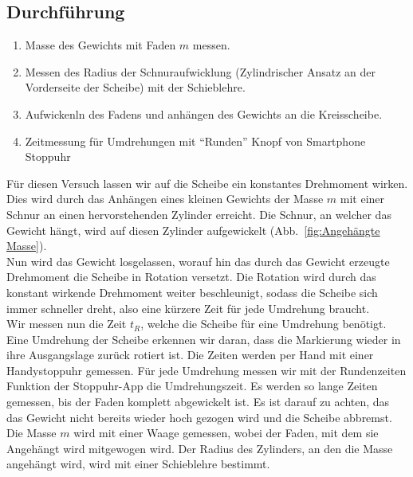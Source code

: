 \documentclass{article}
\begin{document}
		\subsection{Durchführung}
			\begin{enumerate}
				\item Masse des Gewichts mit Faden \(m\) messen.
				\item Messen des Radius der Schnuraufwicklung (Zylindrischer Ansatz an der Vorderseite der Scheibe) mit der Schieblehre.
				\item Aufwickenln des Fadens und anhängen des Gewichts an die Kreisscheibe.
				\item Zeitmessung für Umdrehungen mit \enquote{Runden} Knopf von Smartphone Stoppuhr
			\end{enumerate} %
			Für diesen Versuch lassen wir auf die Scheibe ein konstantes Drehmoment wirken.
			Dies wird durch das Anhängen eines kleinen Gewichts der Masse \(m\) mit einer Schnur an einen hervorstehenden Zylinder erreicht.
			Die Schnur, an welcher das Gewicht hängt, wird auf diesen Zylinder aufgewickelt (Abb.~\ref{fig:Angehängte Masse}). \\
			Nun wird das Gewicht losgelassen, worauf hin das durch das Gewicht erzeugte Drehmoment die Scheibe in Rotation versetzt.
			Die Rotation wird durch das konstant wirkende Drehmoment weiter beschleunigt, sodass die Scheibe sich immer schneller dreht, also eine kürzere Zeit für jede Umdrehung braucht. \\
			Wir messen nun die Zeit \(t_R\), welche die Scheibe für eine Umdrehung benötigt.
			Eine Umdrehung der Scheibe erkennen wir daran, dass die Markierung wieder in ihre Ausgangslage zurück rotiert ist.
			Die Zeiten werden per Hand mit einer Handystoppuhr gemessen. Für jede Umdrehung messen wir mit der Rundenzeiten Funktion der Stoppuhr-App die Umdrehungszeit.
			Es werden so lange Zeiten gemessen, bis der Faden komplett abgewickelt ist. Es ist darauf zu achten, das das Gewicht nicht bereits wieder hoch gezogen wird und die Scheibe abbremst.
			Die Masse \(m\) wird mit einer Waage gemessen, wobei der Faden, mit dem sie Angehängt wird mitgewogen wird.
			Der Radius des Zylinders, an den die Masse angehängt wird, wird mit einer Schieblehre bestimmt.
\end{document}
